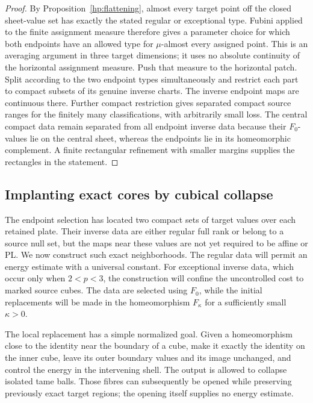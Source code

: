 \begin{proof}
By Proposition~\ref{hp:flattening}, almost every target point off the
closed sheet-value set has exactly the stated regular or exceptional
type.  Fubini applied to the finite assignment measure therefore gives
a parameter choice for which both endpoints have an allowed type for
$\mu$-almost every assigned point.  This is an averaging argument in
three target dimensions; it uses no absolute continuity of the
horizontal assignment measure.  Push that measure to the horizontal
patch.  Split according to the two endpoint types simultaneously and
restrict each part to compact subsets of its genuine inverse charts.
The inverse endpoint maps are continuous there.  Further compact
restriction gives separated compact source ranges for the finitely
many classifications, with arbitrarily small loss.  The central
compact data remain separated from all endpoint inverse data because
their $F_0$-values lie on the central sheet, whereas the endpoints lie
in its homeomorphic complement.  A finite rectangular refinement
with smaller margins supplies the rectangles in the statement.
\end{proof}

\subsection{Implanting exact cores by cubical collapse}

The endpoint selection has located two compact sets of target values
over each retained plate.  Their inverse data are either regular full
rank or belong to a source null set, but the maps near these values are
not yet required to be affine or PL.  We now construct such exact
neighborhoods.  The regular data will permit an energy estimate with a
universal constant.  For exceptional inverse data, which occur only
when $2<p<3$, the construction will confine the uncontrolled cost to
marked source cubes.  The data are selected using $F_0$, while the
initial replacements will be made in the homeomorphism $F_\kappa$
for a sufficiently small $\kappa>0$.

The local replacement has a simple normalized goal.  Given a
homeomorphism close to the identity near the boundary of a cube, make
it exactly the identity on the inner cube, leave its outer boundary
values and its image unchanged, and control the energy in the
intervening shell.  The output is allowed to collapse isolated tame
balls.  Those fibres can subsequently be opened while preserving
previously exact target regions; the opening itself supplies no energy
estimate.

